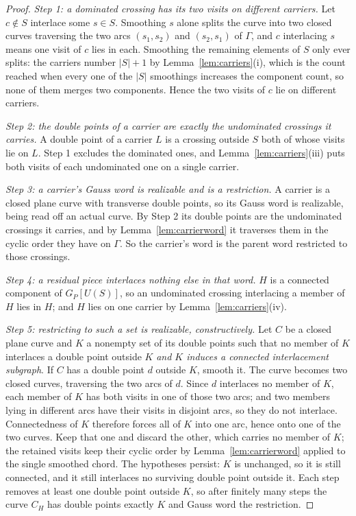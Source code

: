 \begin{proof}
\emph{Step 1: a dominated crossing has its two visits on different carriers.}
Let $c\notin S$ interlace some $s\in S$. Smoothing $s$ alone splits the curve
into two closed curves traversing the two arcs $(s_1,s_2)$ and $(s_2,s_1)$ of
$\Gamma$, and $c$ interlacing $s$ means one visit of $c$ lies in each. Smoothing
the remaining elements of $S$ only ever splits: the carriers number $|S|+1$ by
Lemma~\ref{lem:carriers}(i), which is the count reached when every one of the
$|S|$ smoothings increases the component count, so none of them merges two
components. Hence the two visits of $c$ lie on different carriers.

\emph{Step 2: the double points of a carrier are exactly the undominated
crossings it carries.} A double point of a carrier $L$ is a crossing outside $S$
both of whose visits lie on $L$. Step 1 excludes the dominated ones, and
Lemma~\ref{lem:carriers}(iii) puts both visits of each undominated one on a
single carrier.

\emph{Step 3: a carrier's Gauss word is realizable and is a restriction.} A
carrier is a closed plane curve with transverse double points, so its Gauss word
is realizable, being read off an actual curve. By Step 2 its double points are
the undominated crossings it carries, and by Lemma~\ref{lem:carrierword} it
traverses them in the cyclic order they have on $\Gamma$. So the carrier's word
is the parent word restricted to those crossings.

\emph{Step 4: a residual piece interlaces nothing else in that word.} $H$ is a
connected component of $G_P[U(S)]$, so an undominated crossing interlacing a
member of $H$ lies in $H$; and $H$ lies on one carrier by
Lemma~\ref{lem:carriers}(iv).

\emph{Step 5: restricting to such a set is realizable, constructively.} Let $C$
be a closed plane curve and $K$ a nonempty set of its double points such that no
member of $K$ interlaces a double point outside $K$ \emph{and $K$ induces a
connected interlacement subgraph}. If $C$ has a double point $d$ outside $K$,
smooth it. The curve becomes two closed curves, traversing the two arcs of $d$.
Since $d$ interlaces no member of $K$, each member of $K$ has both visits in one
of those two arcs; and two members lying in different arcs have their visits in
disjoint arcs, so they do not interlace. Connectedness of $K$ therefore forces
all of $K$ into one arc, hence onto one of the two curves. Keep that one and
discard the other, which carries no member of $K$; the retained visits keep
their cyclic order by Lemma~\ref{lem:carrierword} applied to the single smoothed
chord. The hypotheses persist: $K$ is unchanged, so it is still connected, and
it still interlaces no surviving double point outside it. Each step removes at
least one double point outside $K$, so after finitely many steps the curve
$C_H$ has double points exactly $K$ and Gauss word the restriction.


\end{proof}
